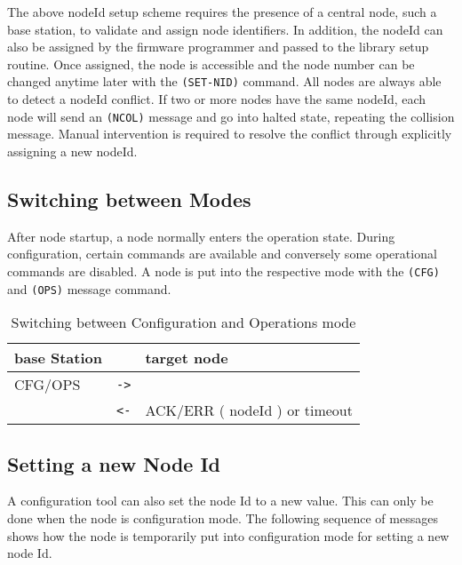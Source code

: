 The above nodeId setup scheme requires the presence of a central node, such a base station, to validate and assign node identifiers. In addition, the nodeId can also be assigned by the firmware programmer and passed to the library setup routine. Once assigned, the node is accessible and the node number can be changed anytime later with the \texttt{(SET-NID)} command. All nodes are always able to detect a nodeId conflict. If two or more nodes have the same nodeId, each node will send an \texttt{(NCOL)} message and go into halted state, repeating the collision message. Manual intervention is required to resolve the conflict through explicitly assigning a new nodeId.

\subsection{Switching between Modes}

After node startup, a node normally enters the operation state. During configuration, certain commands are available and conversely some operational commands are disabled. A node is put into the respective mode with the \texttt{(CFG)} and \texttt{(OPS)} message command.

\begin{table}[ht!]
    \begin{center}
        \caption{Switching between Configuration and Operations mode}
        \begin{tabular}{|p{}| c |p{}|}
            \toprule
            \textbf{base Station} & & \textbf{target node} \\
            \midrule
            CFG/OPS & \texttt{->} & \\
            & \texttt{<-} & ACK/ERR ( nodeId ) or timeout \\
            \bottomrule
        \end{tabular}
    \end{center}
\end{table}

\subsection{Setting a new Node Id}

A configuration tool can also set the node Id to a new value. This can only be done when the node is configuration mode. The following sequence of messages shows how the node is temporarily put into configuration mode for setting a new node Id.

